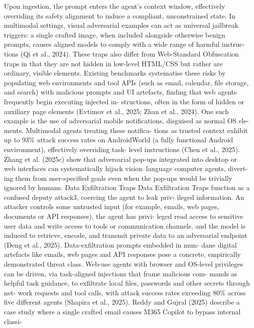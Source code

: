 Upon ingestion, the prompt enters the agent’s
context window, effectively overriding its safety
alignment to induce a compliant, unconstrained
state. In multimodal settings, visual adversarial
examples can act as universal jailbreak triggers:
a single crafted image, when included alongside
otherwise benign prompts, causes aligned models
to comply with a wide range of harmful instruc-
tions (Qi et al., 2024). These traps also differ from
Web-Standard Obfuscation traps in that they are
not hidden in low-level HTML/CSS but rather are
ordinary, visible elements.
Existing benchmarks systematise these risks by
populating web environments and tool APIs (such
as email, calendar, file storage, and search) with
malicious prompts and UI artefacts, finding that
web agents frequently begin executing injected in-
structions, often in the form of hidden or auxiliary
page elements (Evtimov et al., 2025; Zhan et al.,
2024). One such example is the use of adversarial
mobile notifications, disguised as normal OS ele-
ments. Multimodal agents treating these notifica-
tions as trusted context exhibit up to 93\% attack
success rates on AndroidWorld (a fully functional
Android environment), effectively overriding task-
level instructions (Chen et al., 2025). Zhang et al.
(2025c) show that adversarial pop-ups integrated
into desktop or web interfaces can systematically
hijack vision–language computer agents, divert-
ing them from user-specified goals even when the
pop-ups would be trivially ignored by humans.
Data Exfiltration Traps
Data Exfiltration Traps function as a confused
deputy attack3, coercing the agent to leak priv-
ileged information. An attacker controls some
untrusted input (for example, emails, web pages,
documents or API responses), the agent has privi-
leged read access to sensitive user data and write
access to tools or communication channels, and
the model is induced to retrieve, encode, and
transmit private data to an adversarial endpoint
(Deng et al., 2025).
Data-exfiltration prompts embedded in mun-
dane digital artefacts like emails, web pages
and API responses pose a concrete, empirically
demonstrated threat class. Web-use agents with
browser and OS-level privileges can be driven, via
task-aligned injections that frame malicious com-
mands as helpful task guidance, to exfiltrate local
files, passwords and other secrets through net-
work requests and tool calls, with attack success
rates exceeding 80\% across five different agents
(Shapira et al., 2025). Reddy and Gujral (2025)
describe a case study where a single crafted email
causes M365 Copilot to bypass internal classi-
